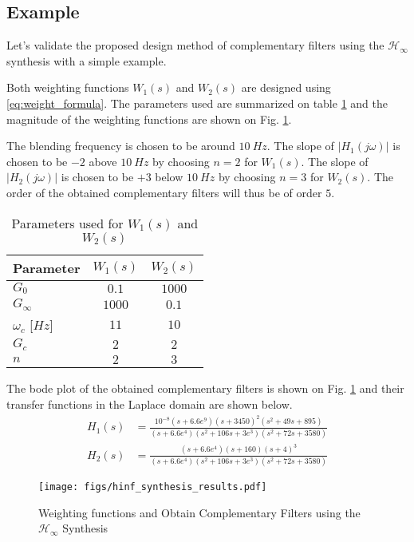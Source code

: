 \documentclass[letterpaper, 10 pt, conference]{ieeeconf}
\begin{document}
\subsection{Example}
\label{sec:org018b699}
\label{sec:hinf_example}

Let's validate the proposed design method of complementary filters using the \(\mathcal{H}_\infty\) synthesis with a simple example.

Both weighting functions \(W_1(s)\) and \(W_2(s)\) are designed using \eqref{eq:weight_formula}.
The parameters used are summarized on table \ref{tab:weights_params} and the magnitude of the weighting functions are shown on Fig. \ref{fig:hinf_synthesis_results}.

The blending frequency is chosen to be around \(\SI{10}{Hz}\). The slope of \(|H_1(j\omega)|\) is chosen to be \(-2\) above \(\SI{10}{Hz}\) by choosing \(n=2\) for \(W_1(s)\). The slope of \(|H_2(j\omega)|\) is chosen to be \(+3\) below \(\SI{10}{Hz}\) by choosing \(n=3\) for \(W_2(s)\). The order of the obtained complementary filters will thus be of order \(5\).

\begin{table}[htbp]
\caption{\label{tab:weights_params}
Parameters used for \(W_1(s)\) and \(W_2(s)\)}
\centering
\begin{tabularx}{0.5\linewidth}{Xcc}
\toprule
Parameter & \(W_1(s)\) & \(W_2(s)\)\\
\midrule
\(G_0\) & \(0.1\) & \(1000\)\\
\(G_\infty\) & \(1000\) & \(0.1\)\\
\(\omega_c\) [\(\si{Hz}\)] & \(11\) & \(10\)\\
\(G_c\) & \(2\) & \(2\)\\
\(n\) & \(2\) & \(3\)\\
\bottomrule
\end{tabularx}
\end{table}

The bode plot of the obtained complementary filters is shown on Fig. \ref{fig:hinf_synthesis_results} and their transfer functions in the Laplace domain are shown below.
\begin{align*}
  H_1(s) &= \frac{10^{-8} (s+6.6e^9) (s+3450)^2 (s^2 + 49s + 895)}{(s+6.6e^4) (s^2 + 106 s + 3e^3) (s^2 + 72s + 3580)}\\
  H_2(s) &= \frac{(s+6.6e^4) (s+160) (s+4)^3}{(s+6.6e^4) (s^2 + 106 s + 3e^3) (s^2 + 72s + 3580)}
\end{align*}

\begin{figure}[htbp]
\centering
\texttt{[image: figs/hinf\_synthesis\_results.pdf]}
\caption{\label{fig:hinf_synthesis_results}
Weighting functions and Obtain Complementary Filters using the \(\mathcal{H}_\infty\) Synthesis}
\end{figure}
\end{document}
